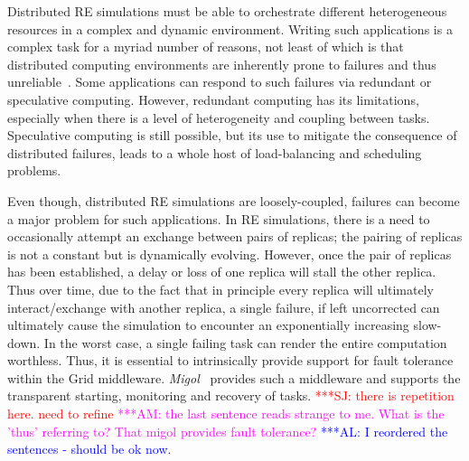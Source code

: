 \documentclass[conference,final]{IEEEtran}
\newcommand{\alnote}[1]{ {\textcolor{blue} { ***AL: #1 }}}
\newcommand{\amnote}[1]{ {\textcolor{magenta} { ***AM: #1 }}}
\newcommand{\jhanote}[1]{ {\textcolor{red} { ***SJ: #1 }}}
\newcommand{\alnote}[1]{}
\newcommand{\amnote}[1]{}
\newcommand{\jhanote}[1]{}
\begin{document}


Distributed RE simulations must be able to orchestrate different
heterogeneous resources in a complex and dynamic environment.  Writing
such applications is a complex task for a myriad number of reasons,
not least of which is that distributed computing environments are
inherently prone to failures and thus
unreliable~\cite{schroeder,10.1109/E-SCIENCE.2006.93,DBLP:conf/grid/KhaliliHOSC06}.
Some applications can respond to such failures via redundant or
speculative computing.  However, redundant computing has its
limitations, especially when there is a level of heterogeneity and
coupling between tasks.  Speculative computing is still possible, but
its use to mitigate the consequence of distributed failures, leads to
a whole host of load-balancing and scheduling problems. 


Even though, distributed RE simulations are loosely-coupled, failures
can become a major problem for such applications.  In RE simulations,
there is a need to occasionally attempt an exchange between pairs of
replicas; the pairing of replicas is not a constant but is dynamically
evolving.  However, once the pair of replicas has been established, a
delay or loss of one replica will stall the other replica.  Thus over
time, due to the fact that in principle every replica will ultimately
interact/exchange with another replica, a single failure, if left
uncorrected can ultimately cause the simulation to encounter an
exponentially increasing slow-down.  In the worst case, a single
failing task can render the entire computation worthless.  Thus, it is
essential to intrinsically provide support for fault tolerance within
the Grid middleware.  \emph{Migol}~\cite{schnorLuckow08} provides such
a middleware and supports the transparent starting, monitoring and
recovery of tasks.
\jhanote{there is repetition here. need to refine} \amnote{the last
  sentence reads strange to me.  What is the 'thus' referring to?  That
  migol provides fault tolerance?}      
\alnote{I reordered the sentences - should be ok now.}
\end{document}
